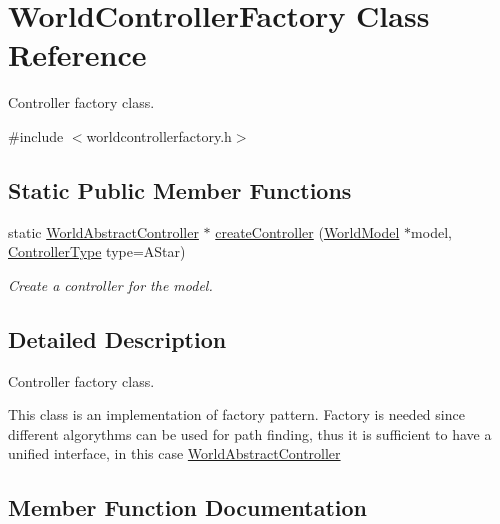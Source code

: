 \hypertarget{classWorldControllerFactory}{}\section{World\+Controller\+Factory Class Reference}
\label{classWorldControllerFactory}


Controller factory class.  




{\ttfamily \#include $<$worldcontrollerfactory.\+h$>$}

\subsection*{Static Public Member Functions}
\begin{DoxyCompactItemize}
\item 
static \hyperlink{classWorldAbstractController}{World\+Abstract\+Controller} $\ast$ \hyperlink{classWorldControllerFactory_a90d9c0f2d0b6a58b2ad4336e539057d0}{create\+Controller} (\hyperlink{classWorldModel}{World\+Model} $\ast$model, \hyperlink{group__controller_ga81059b4122c9dd4608d347eb117ae8c9}{Controller\+Type} type=A\+Star)
\begin{DoxyCompactList}\small\item\em Create a controller for the model. \end{DoxyCompactList}\end{DoxyCompactItemize}


\subsection{Detailed Description}
Controller factory class. 

This class is an implementation of factory pattern. Factory is needed since different algorythms can be used for path finding, thus it is sufficient to have a unified interface, in this case \hyperlink{classWorldAbstractController}{World\+Abstract\+Controller} 

\subsection{Member Function Documentation}
